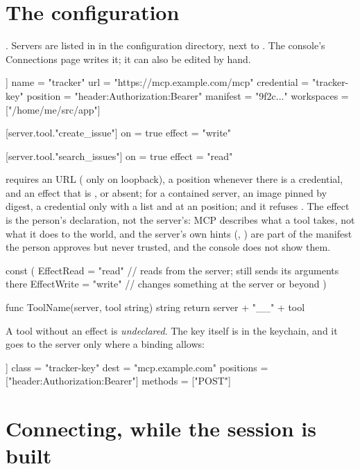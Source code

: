 \section{The configuration}

. Servers are listed in  in
the configuration directory, next to . The console's
Connections page writes it; it can also be edited by hand.

\begin{txt}
[[server]]
name = "tracker"
url = "https://mcp.example.com/mcp"
credential = "tracker-key"
position = "header:Authorization:Bearer"
manifest = "9f2c..."
workspaces = ["/home/me/src/app"]

[server.tool."create_issue"]
on = true
effect = "write"

[server.tool."search_issues"]
on = true
effect = "read"
\end{txt}

 requires an  URL ( only on
loopback), a position whenever there is a credential, and an effect that is
,  or absent; for a contained server, an image
pinned by digest, a credential only with a  list and at an
 position; and it refuses .
The effect is the person's
declaration, not the server's: MCP describes what a tool takes, not what it
does to the world, and the server's own hints (,
) are part of the manifest the person approves but
never trusted, and the console does not show them.

\begin{go}
const (
    EffectRead  = "read"  // reads from the server; still sends its arguments there
    EffectWrite = "write" // changes something at the server or beyond
)

func ToolName(server, tool string) string { return server + "__" + tool }
\end{go}

A tool without an effect is \emph{undeclared}. The key itself is in the
keychain, and it goes to the server only where a binding allows:

\begin{txt}
[[bind]]
class = "tracker-key"
dest = "mcp.example.com"
positions = ["header:Authorization:Bearer"]
methods = ["POST"]
\end{txt}

\section{Connecting, while the session is built}

